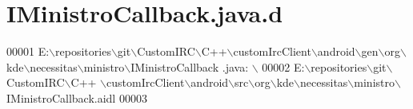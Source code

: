 \hypertarget{_i_ministro_callback_8java_8d}{\section{I\-Ministro\-Callback.\-java.\-d}
\label{d2/dbd/_i_ministro_callback_8java_8d}
}

\begin{DoxyCode}
00001 E:\(\backslash\)repositories\(\backslash\)git\(\backslash\)CustomIRC\(\backslash\)C++\(\backslash\)customIrcClient\(\backslash\)android\(\backslash\)gen\(\backslash\)org\(\backslash\)kde\(\backslash\)necessitas\(\backslash\)ministro\(\backslash\)IMinistroCallback
      .java: \(\backslash\)
00002   E:\(\backslash\)repositories\(\backslash\)git\(\backslash\)CustomIRC\(\backslash\)C++
      \(\backslash\)customIrcClient\(\backslash\)android\(\backslash\)src\(\backslash\)org\(\backslash\)kde\(\backslash\)necessitas\(\backslash\)ministro\(\backslash\)IMinistroCallback.aidl 
00003 
\end{DoxyCode}
